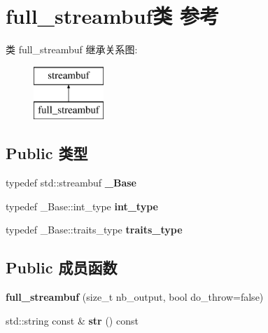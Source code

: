\hypertarget{classfull__streambuf}{}\section{full\+\_\+streambuf类 参考}
\label{classfull__streambuf}
类 full\+\_\+streambuf 继承关系图\+:\begin{figure}[H]
\begin{center}
\leavevmode
\includegraphics[height=2.000000cm]{classfull__streambuf}
\end{center}
\end{figure}
\subsection*{Public 类型}
\begin{DoxyCompactItemize}
\item 
\mbox{\label{classfull__streambuf_a0a3d5d4475cdd6edb7b4f177996f40f3}} 
typedef std\+::streambuf {\bfseries \+\_\+\+Base}
\item 
\mbox{\label{classfull__streambuf_a07b506b7914ab1b0258894330cfd5fc3}} 
typedef \+\_\+\+Base\+::int\+\_\+type {\bfseries int\+\_\+type}
\item 
\mbox{\label{classfull__streambuf_a6c36d92e9f15039b2db354dbbfad015d}} 
typedef \+\_\+\+Base\+::traits\+\_\+type {\bfseries traits\+\_\+type}
\end{DoxyCompactItemize}
\subsection*{Public 成员函数}
\begin{DoxyCompactItemize}
\item 
\mbox{\label{classfull__streambuf_ab959976d14971469dbc449a7aca41161}} 
{\bfseries full\+\_\+streambuf} (size\+\_\+t nb\+\_\+output, bool do\+\_\+throw=false)
\item 
\mbox{\label{classfull__streambuf_acba02352830c2ebc85a82451f3b46395}} 
std\+::string const  \& {\bfseries str} () const
\end{DoxyCompactItemize}
